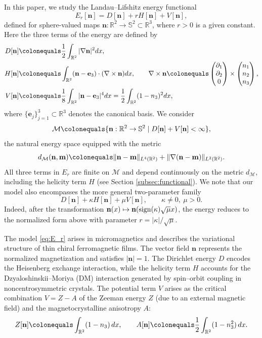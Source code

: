 \documentclass{amsart}
\numberwithin{equation}{section}
\theoremstyle{definition}
\theoremstyle{remark}
\newcommand{\R}{\mathbb{R}}
\renewcommand{\S}{\mathbb{S}}
\newcommand{\boM}{\mathcal{M}}
\DeclareMathOperator{\sign}{{\rm sign}}
\newcommand{\bom}{{\mathbf{m}}}
\newcommand{\bn}{{\mathbf{n}}}
\newcommand{\boe}{{\mathbf{e}}}
\begin{document}
In this paper, we study the Landau--Lifshitz energy functional
\begin{equation}\label{eq:E_r}
    E_r[\bn] = D[\bn] + rH[\bn] + V[\bn],
\end{equation}
defined for sphere-valued maps $\bn:\R^2\to\S^2\subset\R^3$, where $r>0$ is a given constant.
Here the three terms of the energy are defined by
\begin{align*}
    D[\bn] &\colonequals \frac12 \int_{\R^2} |\nabla \bn|^2dx,\\
    H[\bn] &\colonequals \int_{\R^2} (\bn-\boe_3)\cdot(\nabla\times\bn)dx, \qquad \nabla\times\bn \colonequals 
    \begin{pmatrix}
        \partial_1\\
        \partial_2\\
        0
    \end{pmatrix}
    \times
        \begin{pmatrix}
        n_1\\
        n_2\\
        n_3
    \end{pmatrix},
    \\
    V[\bn] &\colonequals \frac18 \int_{\R^2} |\bn-\boe_3|^4dx = \frac{1}{2}\int_{\R^2}(1-n_3)^2dx,
\end{align*}
where $\{\boe_j\}_{j=1}^3\subset\R^3$ denotes the canonical basis.
We consider
\[
\boM \colonequals \{\bn:\R^2\to\S^2 \mid D[\bn] + V[\bn] < \infty \},
\]
the natural energy space equipped with the metric
\[
d_{\boM}(\bn,\bom)\colonequals \|\bn-\bom\|_{L^4(\R^2)}+\|\nabla(\bn-\bom)\|_{L^2(\R^2)}.
\]
All three terms in $E_r$ are finite on $\boM$ and depend continuously on the metric $d_{\boM}$, including the helicity term $H$ (see Section \ref{subsec:functional}).
We note that our model also encompasses the more general two-parameter family
\[
D[\bn] + \kappa H[\bn] + \mu V[\bn], \qquad \kappa\neq0,\ \mu > 0.
\]
Indeed, after the transformation $\bn(x)\mapsto\bn(\sign(\kappa)\sqrt{\mu}x)$, the energy reduces to the normalized form above with parameter $r = |\kappa| / \sqrt{\mu}$.

\medskip

The model \eqref{eq:E_r} arises in micromagnetics and describes the variational structure of thin chiral ferromagnetic films.  
The vector field $\bn$ represents the normalized magnetization and satisfies $|\bn|=1$.  
The Dirichlet energy $D$ encodes the Heisenberg exchange interaction, while the helicity term $H$ accounts for the Dzyaloshinskii--Moriya (DM) interaction generated by spin--orbit coupling in noncentrosymmetric crystals.  
The potential term $V$ arises as the critical combination $V = Z - A$ of the Zeeman energy $Z$ (due to an external magnetic field) and the magnetocrystalline anisotropy $A$:
\[
Z[\bn] \colonequals \int_{\R^2} (1 - n_3)\, dx,
\qquad
A[\bn] \colonequals \frac12 \int_{\R^2} (1 - n_3^2)\, dx.
\]
\end{document}
